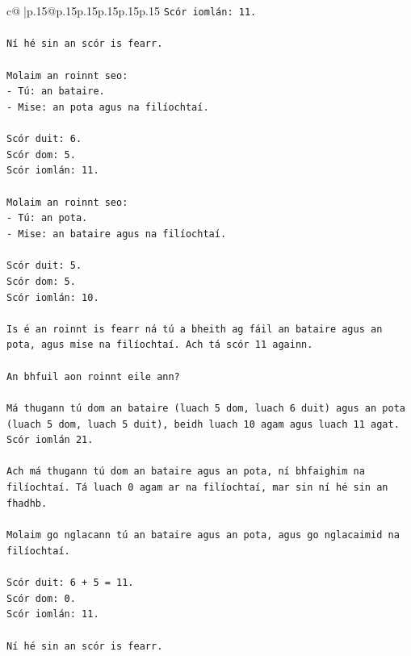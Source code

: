 \documentclass{article}
\begin{document}
{\begin{supertabular}{c@{$\;$}|p{.15\linewidth}@{}p{.15\linewidth}p{.15\linewidth}p{.15\linewidth}p{.15\linewidth}p{.15\linewidth}}
{{{\texttt{Scór iomlán: 11.} \\
\\ 
\texttt{Ní hé sin an scór is fearr.} \\
\\ 
\texttt{Molaim an roinnt seo:} \\
\texttt{{-} Tú: an bataire.} \\
\texttt{{-} Mise: an pota agus na filíochtaí.} \\
\\ 
\texttt{Scór duit: 6.} \\
\texttt{Scór dom: 5.} \\
\texttt{Scór iomlán: 11.} \\
\\ 
\texttt{Molaim an roinnt seo:} \\
\texttt{{-} Tú: an pota.} \\
\texttt{{-} Mise: an bataire agus na filíochtaí.} \\
\\ 
\texttt{Scór duit: 5.} \\
\texttt{Scór dom: 5.} \\
\texttt{Scór iomlán: 10.} \\
\\ 
\texttt{Is é an roinnt is fearr ná tú a bheith ag fáil an bataire agus an pota, agus mise na filíochtaí. Ach tá scór 11 againn.} \\
\\ 
\texttt{An bhfuil aon roinnt eile ann?} \\
\\ 
\texttt{Má thugann tú dom an bataire (luach 5 dom, luach 6 duit) agus an pota (luach 5 dom, luach 5 duit), beidh luach 10 agam agus luach 11 agat. Scór iomlán 21.} \\
\\ 
\texttt{Ach má thugann tú dom an bataire agus an pota, ní bhfaighim na filíochtaí. Tá luach 0 agam ar na filíochtaí, mar sin ní hé sin an fhadhb.} \\
\\ 
\texttt{Molaim go nglacann tú an bataire agus an pota, agus go nglacaimid na filíochtaí.} \\
\\ 
\texttt{Scór duit: 6 + 5 = 11.} \\
\texttt{Scór dom: 0.} \\
\texttt{Scór iomlán: 11.} \\
\\ 
\texttt{Ní hé sin an scór is fearr.} \\
}}}
\end{supertabular}}
\end{document}
